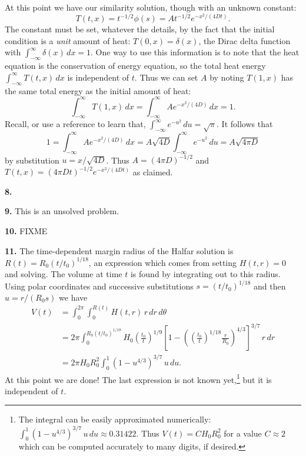\documentclass[10pt]{amsart}
\newcommand{\mfile}[1]{
\begin{quote}
\bigskip
\VerbatimInput[frame=single,label=\fbox{\normalsize \textsl{\,#1\,}},fontfamily=courier,fontsize=\footnotesize]{#1}
\end{quote}
}
\newcommand{\prob}[1]{\bigskip\noindent\large\textbf{#1.}\normalsize }
\begin{document}
At this point we have our similarity solution, though with an unknown constant:
    $$T(t,x) = t^{-1/2} \phi(s) = A t^{-1/2} e^{- x^2/(4Dt)}.$$
The constant must be set, whatever the details, by the fact that the initial condition is a \emph{unit} amount of heat: $T(0,x) = \delta(x)$, the Dirac delta function with $\int_{-\infty}^\infty \delta(x)\,dx = 1$.  One way to use this information is to note that the heat equation is the conservation of energy equation, so the total heat energy $\int_{-\infty}^\infty T(t,x)\,dx$ is independent of $t$.  Thus we can set $A$ by noting $T(1,x)$ has the same total energy as the initial amount of heat:
    $$\int_{-\infty}^\infty T(1,x)\,dx = \int_{-\infty}^\infty A e^{- x^2/(4D)}\,dx = 1.$$
Recall, or use a reference to learn that, $\int_{-\infty}^\infty e^{- u^2}\,du = \sqrt{\pi}$.  It follows that
    $$1 = \int_{-\infty}^\infty A e^{- x^2/(4D)}\,dx = A \sqrt{4D} \int_{-\infty}^\infty e^{- u^2}\,du = A \sqrt{4\pi D}$$
by substitution $u=x/\sqrt{4D}$.  Thus $A = (4\pi D)^{-1/2}$ and $T(t,x) = (4\pi D t)^{-1/2} e^{- x^2/(4Dt)}$ as claimed.

\prob{8}

\mfile{verifyheat.m}

\prob{9}  This is an unsolved problem.

\prob{10}  FIXME

\prob{11}  The time-dependent margin radius of the Halfar solution is $R(t) = R_0 (t/t_0)^{1/18}$, an expression which comes from setting $H(t,r)=0$ and solving.  The volume at time $t$ is found by integrating out to this radius.  Using polar coordinates and successive substitutions $s = (t/t_0)^{1/18}$ and then $u=r/(R_0 s)$ we have
\begin{align*}
V(t) &= \int_0^{2\pi} \int_0^{R(t)} H(t,r) \,r\,dr\,d\theta \\
     &= 2\pi \int_0^{R_0 (t/t_0)^{1/18}} H_0 \left(\frac{t_0}{t}\right)^{1/9} \left[1 - \left(\left(\frac{t_0}{t}\right)^{1/18} \frac{r}{R_0}\right)^{4/3}\right]^{3/7} \,r\,dr \\
     &= 2\pi H_0 R_0^2 \int_0^1 \left(1 - u^{4/3}\right)^{3/7} \,u\,du.
\end{align*}
At this point we are done!  The last expression is not known yet,\footnote{The integral can be easily approximated numerically: $\int_0^1 (1 - u^{4/3})^{3/7} \,u\,du \approx 0.31422$.  Thus $V(t) = C H_0 R_0^2$ for a value $C\approx 2$ which can be computed accurately to many digits, if desired.} but it is independent of $t$.
\end{document}
